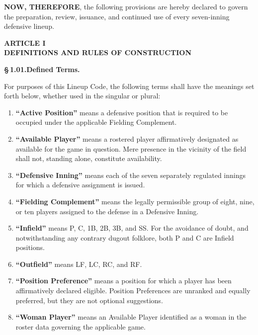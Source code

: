 \documentclass[11pt]{article}
\newcommand{\articleheading}[1]{%
  \vspace{6pt}
  \begin{center}
    \large\bfseries #1
  \end{center}
  \vspace{-3pt}
}
\newcommand{\sectionheading}[2]{%
  \vspace{4pt}
  \noindent\textbf{\S\,#1.\quad #2}\par
}
\begin{document}
\textbf{NOW, THEREFORE}, the following provisions are hereby declared to
govern the preparation, review, issuance, and continued use of every
seven-inning defensive lineup.

\articleheading{ARTICLE I\\DEFINITIONS AND RULES OF CONSTRUCTION}

\sectionheading{1.01}{Defined Terms.}
For purposes of this Lineup Code, the following terms shall have the meanings
set forth below, whether used in the singular or plural:

\begin{enumerate}[label=(\alph*)]
  \item \textbf{``Active Position''} means a defensive position that is
  required to be occupied under the applicable Fielding Complement.

  \item \textbf{``Available Player''} means a rostered player affirmatively
  designated as available for the game in question. Mere presence in the
  vicinity of the field shall not, standing alone, constitute availability.

  \item \textbf{``Defensive Inning''} means each of the seven separately
  regulated innings for which a defensive assignment is issued.

  \item \textbf{``Fielding Complement''} means the legally permissible group
  of eight, nine, or ten players assigned to the defense in a Defensive
  Inning.

  \item \textbf{``Infield''} means P, C, 1B, 2B, 3B, and SS. For the avoidance
  of doubt, and notwithstanding any contrary dugout folklore, both P and C
  are Infield positions.

  \item \textbf{``Outfield''} means LF, LC, RC, and RF.

  \item \textbf{``Position Preference''} means a position for which a player
  has been affirmatively declared eligible. Position Preferences are
  unranked and equally preferred, but they are not optional suggestions.

  \item \textbf{``Woman Player''} means an Available Player identified as a
  woman in the roster data governing the applicable game.
\end{enumerate}
\end{document}
